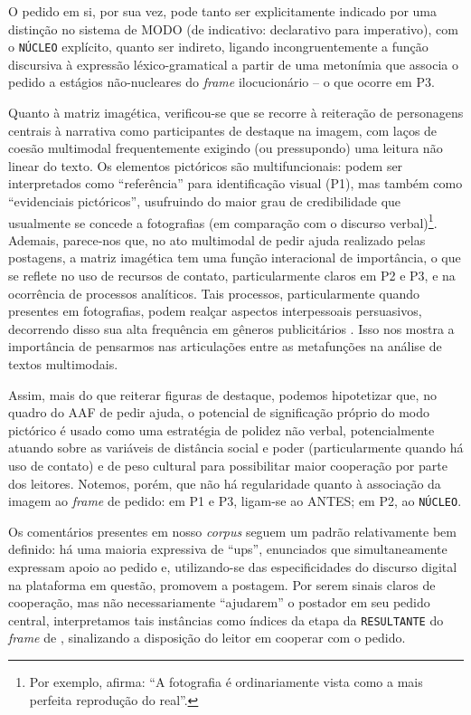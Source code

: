 \documentclass{textolivre}
\begin{document}
O pedido em si, por sua vez, pode tanto ser explicitamente indicado por uma distinção no sistema de MODO (de indicativo: declarativo para imperativo), com o \texttt{NÚCLEO} explícito, quanto ser indireto, ligando incongruentemente a função discursiva à expressão léxico-gramatical a partir de uma metonímia que associa o pedido a estágios não-nucleares do \textit{frame} ilocucionário – o que ocorre em P3.

Quanto à matriz imagética, verificou-se que se recorre à reiteração de personagens centrais à narrativa como participantes de destaque na imagem, com laços de coesão multimodal frequentemente exigindo (ou pressupondo) uma leitura não linear do texto. Os elementos pictóricos são multifuncionais: podem ser interpretados como “referência” para identificação visual (P1), mas também como “evidenciais pictóricos”, usufruindo do maior grau de credibilidade que usualmente se concede a fotografias (em comparação com o discurso verbal)\footnote{Por exemplo, \textcite[p.~164, tradução nossa]{bourdieu1999} afirma: “A fotografia é ordinariamente vista como a mais perfeita reprodução do real”.}. Ademais, parece-nos que, no ato multimodal de pedir ajuda realizado pelas postagens, a matriz imagética tem uma função interacional de importância, o que se reflete no uso de recursos de contato, particularmente claros em P2 e P3, e na ocorrência de processos analíticos. Tais processos, particularmente quando presentes em fotografias, podem realçar aspectos interpessoais persuasivos, decorrendo disso sua alta frequência em gêneros publicitários \cite[p. 89--90]{kress2006}. Isso nos mostra a importância de pensarmos nas articulações entre as metafunções na análise de textos multimodais.

Assim, mais do que reiterar figuras de destaque, podemos hipotetizar que, no quadro do AAF de pedir ajuda, o potencial de significação próprio do modo pictórico é usado como uma estratégia de polidez não verbal, potencialmente atuando sobre as variáveis de distância social e poder (particularmente quando há uso de contato) e de peso cultural para possibilitar maior cooperação por parte dos leitores. Notemos, porém, que não há regularidade quanto à associação da imagem ao \textit{frame} de pedido: em P1 e P3, ligam-se ao ANTES; em P2, ao \texttt{NÚCLEO}.

Os comentários presentes em nosso \textit{corpus} seguem um padrão relativamente bem definido: há uma maioria expressiva de “ups”, enunciados que simultaneamente expressam apoio ao pedido e, utilizando-se das especificidades do discurso digital na plataforma em questão, promovem a postagem. Por serem sinais claros de cooperação, mas não necessariamente “ajudarem” o postador em seu pedido central, interpretamos tais instâncias como índices da etapa da \texttt{RESULTANTE} do \textit{frame} de \textcite{panther2017}, sinalizando a disposição do leitor em cooperar com o pedido.
\end{document}
